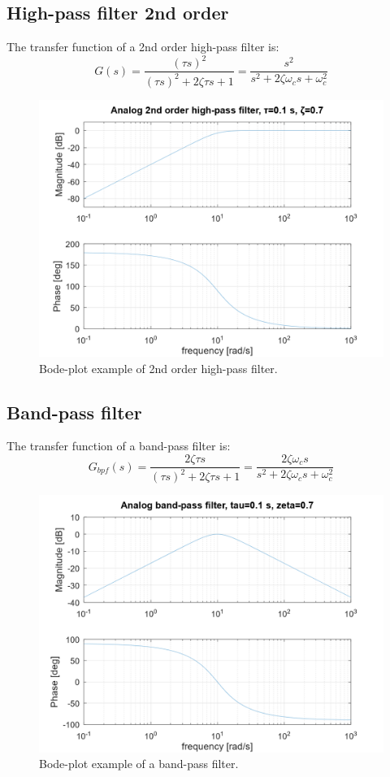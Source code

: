 \documentclass[]{book}
\begin{document}
\hypertarget{high-pass-filter-2nd-order}{%
\subsection{High-pass filter 2nd order}\label{high-pass-filter-2nd-order}}

The transfer function of a 2nd order high-pass filter is:
\[
G(s) =  \frac{(\tau s)^2}{(\tau s)^2 + 2\zeta \tau s + 1} = \frac{s^2}{s^2 + 2\zeta \omega_c s + \omega_c^2}
\label{eq:hpf2}
\]

\begin{figure}
\includegraphics[width=0.8\linewidth]{images/filters/hpf_2nd} \caption{Bode-plot example of 2nd order high-pass filter.}\label{fig:unnamed-chunk-4}
\end{figure}

\hypertarget{band-pass-filter}{%
\subsection{Band-pass filter}\label{band-pass-filter}}

The transfer function of a band-pass filter is:
\[
G_{bpf}(s) =  \frac{2\zeta \tau s}{(\tau s)^2 + 2\zeta \tau s + 1} = \frac{2\zeta \omega_c s}{s^2 + 2\zeta \omega_c s + \omega_c^2}
\label{eq:bpf}
\]

\begin{figure}
\includegraphics[width=0.8\linewidth]{images/filters/bpf} \caption{Bode-plot example of a band-pass filter.}\label{fig:unnamed-chunk-5}
\end{figure}
\end{document}
